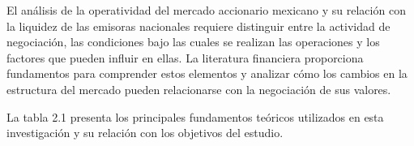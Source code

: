 

El análisis de la operatividad del mercado accionario mexicano y su relación con la liquidez de las emisoras nacionales requiere distinguir entre la actividad de negociación, las condiciones bajo las cuales se realizan las operaciones y los factores que pueden influir en ellas. La literatura financiera proporciona fundamentos para comprender estos elementos y analizar cómo los cambios en la estructura del mercado pueden relacionarse con la negociación de sus valores.

La tabla 2.1 presenta los principales fundamentos teóricos utilizados en esta investigación y su relación con los objetivos del estudio.


